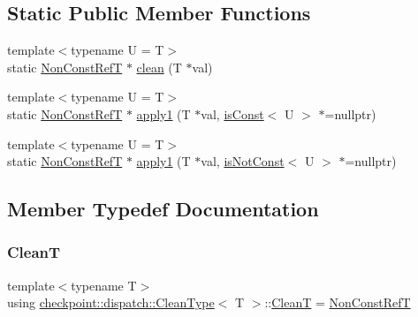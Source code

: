 \subsection*{Static Public Member Functions}
\begin{DoxyCompactItemize}
\item 
{\footnotesize template$<$typename U  = T$>$ }\\static \hyperlink{structcheckpoint_1_1dispatch_1_1_clean_type_a22ac8ae19000187cd7d3d218f3efa46e}{Non\+Const\+RefT} $\ast$ \hyperlink{structcheckpoint_1_1dispatch_1_1_clean_type_a3cae7a0e99d5ad8455d449b564a6e420}{clean} (T $\ast$val)
\item 
{\footnotesize template$<$typename U  = T$>$ }\\static \hyperlink{structcheckpoint_1_1dispatch_1_1_clean_type_a22ac8ae19000187cd7d3d218f3efa46e}{Non\+Const\+RefT} $\ast$ \hyperlink{structcheckpoint_1_1dispatch_1_1_clean_type_ac72dd0e6578ffb7bf75099f432271254}{apply1} (T $\ast$val, \hyperlink{structcheckpoint_1_1dispatch_1_1_clean_type_a8edf98e1e2cbcd55b0b0a57d563be9e7}{is\+Const}$<$ U $>$ $\ast$=nullptr)
\item 
{\footnotesize template$<$typename U  = T$>$ }\\static \hyperlink{structcheckpoint_1_1dispatch_1_1_clean_type_a22ac8ae19000187cd7d3d218f3efa46e}{Non\+Const\+RefT} $\ast$ \hyperlink{structcheckpoint_1_1dispatch_1_1_clean_type_ac29a0f7671b127852a6244c0e9f1919a}{apply1} (T $\ast$val, \hyperlink{structcheckpoint_1_1dispatch_1_1_clean_type_a87436675be4aca146c0ff68911684634}{is\+Not\+Const}$<$ U $>$ $\ast$=nullptr)
\end{DoxyCompactItemize}


\subsection{Member Typedef Documentation}
\mbox{\label{structcheckpoint_1_1dispatch_1_1_clean_type_a5ca6cd4c73773e29c340901d3e6864d2}} 
\subsubsection{\texorpdfstring{CleanT}{CleanT}}
{\footnotesize\ttfamily template$<$typename T$>$ \\
using \hyperlink{structcheckpoint_1_1dispatch_1_1_clean_type}{checkpoint\+::dispatch\+::\+Clean\+Type}$<$ T $>$\+::\hyperlink{structcheckpoint_1_1dispatch_1_1_clean_type_a5ca6cd4c73773e29c340901d3e6864d2}{CleanT} =  \hyperlink{structcheckpoint_1_1dispatch_1_1_clean_type_a22ac8ae19000187cd7d3d218f3efa46e}{Non\+Const\+RefT}}

